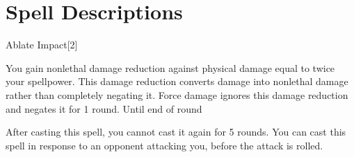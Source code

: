 \section{Spell Descriptions}

\small


\begin{spellsection}{Ablate Impact}[2]
    \begin{spellheader}
    \end{spellheader}
    \begin{spellcontent}
        \begin{spelltargetinginfo}
        \end{spelltargetinginfo}
        \begin{spelleffects}
            \spelleffect You gain nonlethal damage reduction against physical damage equal to twice your spellpower. This damage reduction converts damage into nonlethal damage rather than completely negating it. Force damage ignores this damage reduction and negates it for 1 round.
            \spelldur Until end of round
        \end{spelleffects}
    \end{spellcontent}
    \begin{spellfooter}
        \spellnotes After casting this spell, you cannot cast it again for 5 rounds. You can cast this spell in response to an opponent attacking you, before the attack is rolled.
        \miscastexplode
    \end{spellfooter}
\end{spellsection}

